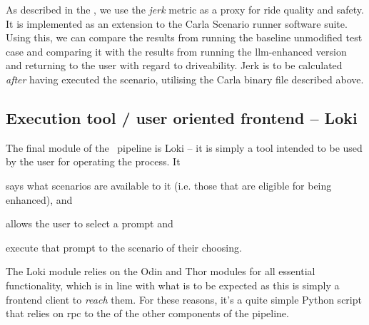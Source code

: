 As described in the , we use the \emph{jerk} metric as a
proxy for ride quality and safety. It is implemented as an extension to the
Carla Scenario runner software suite. Using this, we can compare the results
from running the baseline unmodified test case and comparing it with the results
from running the \acrshort{llm}-enhanced version and returning to the user with
regard to driveability. Jerk is to be calculated \emph{after} having executed
the scenario, utilising the Carla binary file described above.

\subsection{Execution tool / user oriented frontend -- Loki}


The final module of the \hefe~pipeline is Loki -- it is simply a tool intended
to be used by the user for operating the process. It \begin{inparaenum}
    \item  says what scenarios are available to it (i.e. those that are eligible for
    being enhanced), and
    \item allows the user to select a prompt and
    \item execute that prompt to the scenario of their choosing.
\end{inparaenum}

% 

The Loki module relies on the Odin and Thor modules for all essential functionality,
which is in line with what is to be expected as this is simply a frontend client
to \emph{reach} them. For these reasons, it's a quite simple Python script that relies on
\acrshort{rpc} to the  of the other components of the pipeline.